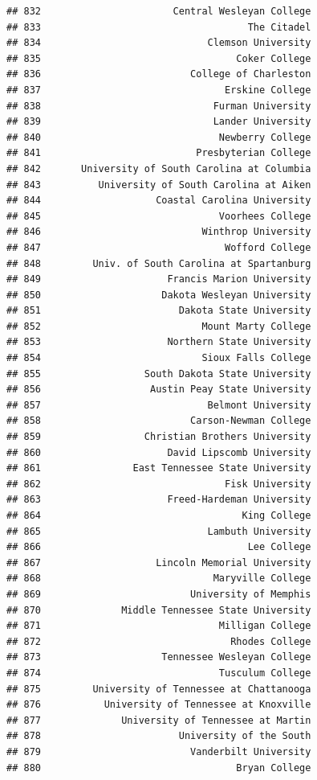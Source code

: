 \documentclass[]{article}
\begin{document}
\begin{verbatim}
## 832                       Central Wesleyan College
## 833                                    The Citadel
## 834                             Clemson University
## 835                                  Coker College
## 836                          College of Charleston
## 837                                Erskine College
## 838                              Furman University
## 839                              Lander University
## 840                               Newberry College
## 841                           Presbyterian College
## 842       University of South Carolina at Columbia
## 843          University of South Carolina at Aiken
## 844                    Coastal Carolina University
## 845                               Voorhees College
## 846                            Winthrop University
## 847                                Wofford College
## 848         Univ. of South Carolina at Spartanburg
## 849                      Francis Marion University
## 850                     Dakota Wesleyan University
## 851                        Dakota State University
## 852                            Mount Marty College
## 853                      Northern State University
## 854                            Sioux Falls College
## 855                  South Dakota State University
## 856                   Austin Peay State University
## 857                             Belmont University
## 858                          Carson-Newman College
## 859                  Christian Brothers University
## 860                      David Lipscomb University
## 861                East Tennessee State University
## 862                                Fisk University
## 863                      Freed-Hardeman University
## 864                                   King College
## 865                             Lambuth University
## 866                                    Lee College
## 867                    Lincoln Memorial University
## 868                              Maryville College
## 869                          University of Memphis
## 870              Middle Tennessee State University
## 871                               Milligan College
## 872                                 Rhodes College
## 873                     Tennessee Wesleyan College
## 874                               Tusculum College
## 875         University of Tennessee at Chattanooga
## 876           University of Tennessee at Knoxville
## 877              University of Tennessee at Martin
## 878                        University of the South
## 879                          Vanderbilt University
## 880                                  Bryan College

\end{verbatim}
\end{document}
